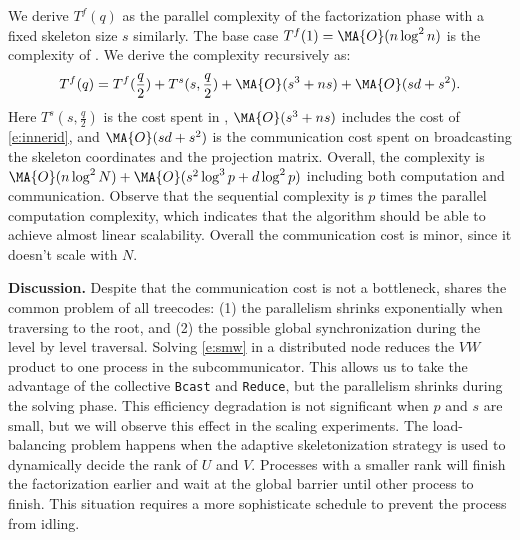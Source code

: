 We derive $T^{f}(q)$ as the 
parallel complexity of the factorization phase with a fixed
skeleton size $s$ similarly. The base case 
$T^f(1) = \MA{O}(n\log^{2}{n})$ is the complexity of .
We derive the complexity recursively as:
\begin{equation}
  T^f(q) = T^f(\frac{q}{2}) + T^s(s,\frac{q}{2}) + \MA{O}(s^3+ ns) + \MA{O}(sd+s^2).
\end{equation}
Here $T^s(s,\frac{q}{2})$ is the cost spent in , 
$\MA{O}(s^3+ ns)$ includes the cost of \eqref{e:innerid}, and
$\MA{O}(sd+s^2)$ is the communication cost spent on broadcasting the
skeleton coordinates and the projection matrix.
Overall, the complexity is 
$\MA{O}(n\log^{2}{N})+\MA{O}(s^2\log^{3}{p}+d\log^{2}{p})$ 
including both computation and communication.
Observe that the sequential complexity is $p$ times the parallel
computation complexity, which indicates that the algorithm should
be able to achieve almost linear scalability. 
Overall the communication cost is minor, since it doesn't scale with $N$.












{\bf Discussion.}
Despite that the communication cost is not a bottleneck, \IASKIT{}
shares the common problem of all treecodes: (1) the parallelism shrinks
exponentially when traversing to the root, and (2) the possible global 
synchronization during the level by level traversal. 
Solving \eqref{e:smw} in a distributed node reduces the $VW$ product
to one process in the subcommunicator. This allows us to take the 
advantage of the collective \texttt{Bcast} and \texttt{Reduce}, but
the parallelism shrinks during the solving phase.
This efficiency degradation is not significant when $p$ and $s$ are
small, but we will observe this effect in the scaling experiments.
The load-balancing problem happens when the adaptive skeletonization
strategy is used to dynamically decide the rank of $U$ and $V$.
Processes with a smaller rank will finish the factorization earlier
and wait at the global barrier until other process to finish.
This situation requires a more sophisticate schedule to prevent
the process from idling.














